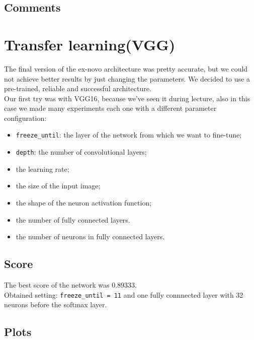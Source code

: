\documentclass[12pt,a4paper]{report}
\begin{document}
		\subsection{Comments}
		
		\section{Transfer learning(VGG)}
	The final version of the ex-novo architecture was pretty accurate, but we could not achieve better results by just changing the parameters. We decided to use a pre-trained, reliable and successful architecture.\\
	Our first try was with VGG16, because we've seen it during lecture, also in this case we made many experiments each one with a different parameter configuration:
	\begin{itemize}
		\item \texttt{freeze\_until}: the layer of the network from which we want to fine-tune;
		\item \texttt{depth}: the number of convolutional layers;
		\item the learning rate;
		\item the size of the input image;
		\item the shape of the neuron activation function;	
		\item the number of fully connected layers.
		\item the number of neurons in fully connected layers.
	\end{itemize}
		\subsection{Score}
			The best score of the network was 0.89333.\\
			Obtained setting: \texttt{freeze\_until = 11} and one fully connnected layer with 32 neurons before the softmax layer.\newpage
		\subsection{Plots}
		
\end{document}
